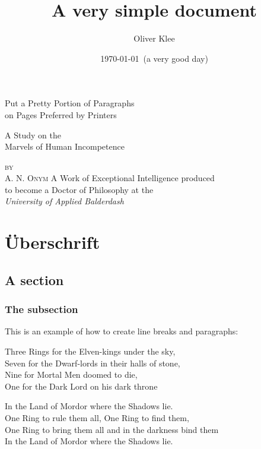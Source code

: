 \documentclass[a4paper]{scrreprt}
\title{A very simple document}
\author{Oliver Klee}
\date{\today\ (a very good day)}
\begin{document}
\begin{titlepage}
\centering
\vspace{4\baselineskip}
{\Huge Put a Pretty Portion of Paragraphs\\on Pages Preferred by Printers\par}
\vspace{2\baselineskip}
{\Large A Study on the\\Marvels of Human Incompetence\par}
\vspace{4\baselineskip}
{\large\textsc{by\\[.5em]A. N. Onym}}
\vfill
A Work of Exceptional Intelligence produced\\ to become a Doctor of Philosophy at the\\[1em]
{\em University of Applied Balderdash}
\end{titlepage}

\tableofcontents

\chapter{Überschrift}
\section{A section}
\subsection{The subsection}

This is an example of how to create line breaks and paragraphs:

Three Rings for the Elven-kings under the sky,\\
Seven for the Dwarf-lords in their halls of stone,\\
Nine for Mortal Men doomed to die,\\
One for the Dark Lord on his dark throne

In the Land of Mordor where the Shadows lie.\\
One Ring to rule them all, One Ring to find them,\\
One Ring to bring them all and in the darkness bind them\\
In the Land of Mordor where the Shadows lie.
\end{document}
